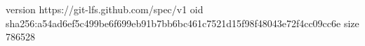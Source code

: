 version https://git-lfs.github.com/spec/v1
oid sha256:a54ad6ef5c499be6f699eb91b7bb6bc461c7521d15f98f48043e72f4cc09cc6e
size 786528
